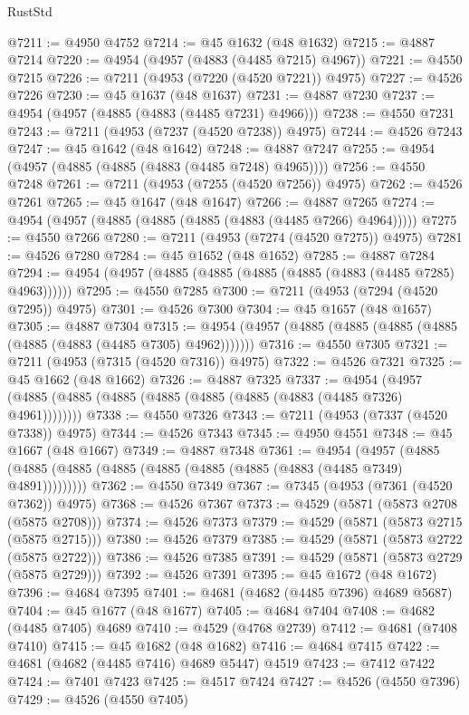 \begin{lexlean}{RustStd}
\begin{coremodule}
@7211 := @4950 @4752
@7214 := @45 @1632 (@48 @1632)
@7215 := @4887 @7214
@7220 := @4954 (@4957 (@4883 (@4485 @7215) @4967))
@7221 := @4550 @7215
@7226 := @7211 (@4953 (@7220 (@4520 @7221)) @4975)
@7227 := @4526 @7226
@7230 := @45 @1637 (@48 @1637)
@7231 := @4887 @7230
@7237 := @4954 (@4957 (@4885 (@4883 (@4485 @7231) @4966)))
@7238 := @4550 @7231
@7243 := @7211 (@4953 (@7237 (@4520 @7238)) @4975)
@7244 := @4526 @7243
@7247 := @45 @1642 (@48 @1642)
@7248 := @4887 @7247
@7255 := @4954 (@4957 (@4885 (@4885 (@4883 (@4485 @7248) @4965))))
@7256 := @4550 @7248
@7261 := @7211 (@4953 (@7255 (@4520 @7256)) @4975)
@7262 := @4526 @7261
@7265 := @45 @1647 (@48 @1647)
@7266 := @4887 @7265
@7274 := @4954 (@4957 (@4885 (@4885 (@4885 (@4883 (@4485 @7266) @4964)))))
@7275 := @4550 @7266
@7280 := @7211 (@4953 (@7274 (@4520 @7275)) @4975)
@7281 := @4526 @7280
@7284 := @45 @1652 (@48 @1652)
@7285 := @4887 @7284
@7294 := @4954 (@4957 (@4885 (@4885 (@4885 (@4885 (@4883 (@4485 @7285) @4963))))))
@7295 := @4550 @7285
@7300 := @7211 (@4953 (@7294 (@4520 @7295)) @4975)
@7301 := @4526 @7300
@7304 := @45 @1657 (@48 @1657)
@7305 := @4887 @7304
@7315 := @4954 (@4957 (@4885 (@4885 (@4885 (@4885 (@4885 (@4883 (@4485 @7305) @4962)))))))
@7316 := @4550 @7305
@7321 := @7211 (@4953 (@7315 (@4520 @7316)) @4975)
@7322 := @4526 @7321
@7325 := @45 @1662 (@48 @1662)
@7326 := @4887 @7325
@7337 := @4954 (@4957 (@4885 (@4885 (@4885 (@4885 (@4885 (@4885 (@4883 (@4485 @7326) @4961))))))))
@7338 := @4550 @7326
@7343 := @7211 (@4953 (@7337 (@4520 @7338)) @4975)
@7344 := @4526 @7343
@7345 := @4950 @4551
@7348 := @45 @1667 (@48 @1667)
@7349 := @4887 @7348
@7361 := @4954
    (@4957 (@4885 (@4885 (@4885 (@4885 (@4885 (@4885 (@4885 (@4883 (@4485 @7349) @4891)))))))))
@7362 := @4550 @7349
@7367 := @7345 (@4953 (@7361 (@4520 @7362)) @4975)
@7368 := @4526 @7367
@7373 := @4529 (@5871 (@5873 @2708 (@5875 @2708)))
@7374 := @4526 @7373
@7379 := @4529 (@5871 (@5873 @2715 (@5875 @2715)))
@7380 := @4526 @7379
@7385 := @4529 (@5871 (@5873 @2722 (@5875 @2722)))
@7386 := @4526 @7385
@7391 := @4529 (@5871 (@5873 @2729 (@5875 @2729)))
@7392 := @4526 @7391
@7395 := @45 @1672 (@48 @1672)
@7396 := @4684 @7395
@7401 := @4681 (@4682 (@4485 @7396) @4689 @5687)
@7404 := @45 @1677 (@48 @1677)
@7405 := @4684 @7404
@7408 := @4682 (@4485 @7405) @4689
@7410 := @4529 (@4768 @2739)
@7412 := @4681 (@7408 @7410)
@7415 := @45 @1682 (@48 @1682)
@7416 := @4684 @7415
@7422 := @4681 (@4682 (@4485 @7416) @4689 @5447) @4519
@7423 := @7412 @7422
@7424 := @7401 @7423
@7425 := @4517 @7424
@7427 := @4526 (@4550 @7396)
@7429 := @4526 (@4550 @7405)

\end{coremodule}
\end{lexlean}
